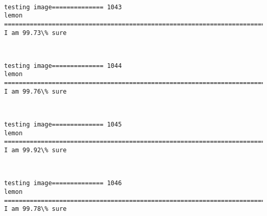 \documentclass[11pt]{article}
\begin{document}
    \begin{center}
    \end{center}
    { \hspace*{\fill} \\}
    
    \begin{Verbatim}[commandchars=\\\{\}]
testing image============== 1043
lemon
============================================================================
I am 99.73\% sure

    \end{Verbatim}

    \begin{center}
    \end{center}
    { \hspace*{\fill} \\}
    
    \begin{Verbatim}[commandchars=\\\{\}]
testing image============== 1044
lemon
============================================================================
I am 99.76\% sure

    \end{Verbatim}

    \begin{center}
    \end{center}
    { \hspace*{\fill} \\}
    
    \begin{Verbatim}[commandchars=\\\{\}]
testing image============== 1045
lemon
============================================================================
I am 99.92\% sure

    \end{Verbatim}

    \begin{center}
    \end{center}
    { \hspace*{\fill} \\}
    
    \begin{Verbatim}[commandchars=\\\{\}]
testing image============== 1046
lemon
============================================================================
I am 99.78\% sure

    \end{Verbatim}
\end{document}
